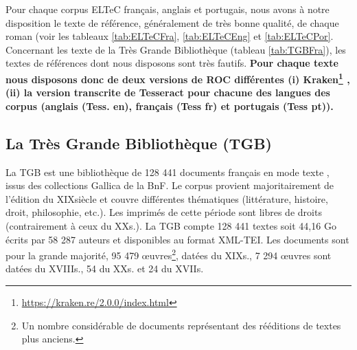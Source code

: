 Pour chaque corpus ELTeC français, anglais et portugais, nous avons à notre disposition le texte de référence, généralement de très bonne qualité, de chaque roman (voir les tableaux \ref{tab:ELTeCFra}, \ref{tab:ELTeCEng} et \ref{tab:ELTeCPor}. Concernant les texte de la Très Grande Bibliothèque (tableau \ref{tab:TGBFra}), les textes de références dont nous disposons sont très fautifs. \textbf{Pour chaque texte nous disposons donc de deux versions de ROC différentes (i) Kraken\footnote{\url{https://kraken.re/2.0.0/index.html}} \cite{kiessling2019escriptorium}, (ii) la version transcrite de Tesseract pour chacune des langues des corpus (anglais (Tess. en), français (Tess fr) et portugais (Tess pt)). }

\subsection{La Très Grande Bibliothèque (TGB)}
 La TGB est une bibliothèque de 128 441 documents français en mode texte %
, issus des collections Gallica de la BnF. Le corpus provient majoritairement de l’édition du XIX\ieme{}siècle et couvre différentes thématiques (littérature, histoire, droit, philosophie, etc.). Les imprimés de cette période sont libres de droits (contrairement à ceux du XX\ieme{}s.). La TGB compte 128 441 textes soit 44,16 Go écrits par 58 287 auteurs et disponibles au format XML-TEI. Les documents sont pour la grande majorité, 95 479 œuvres\footnote{Un nombre considérable de documents représentant des rééditions de textes plus anciens.}, datées du XIX\ieme{}s., 7 294 œuvres sont datées du XVIII\ieme{}s., 54 du XX\ieme{}s. et 24 du XVII\ieme{}s.

